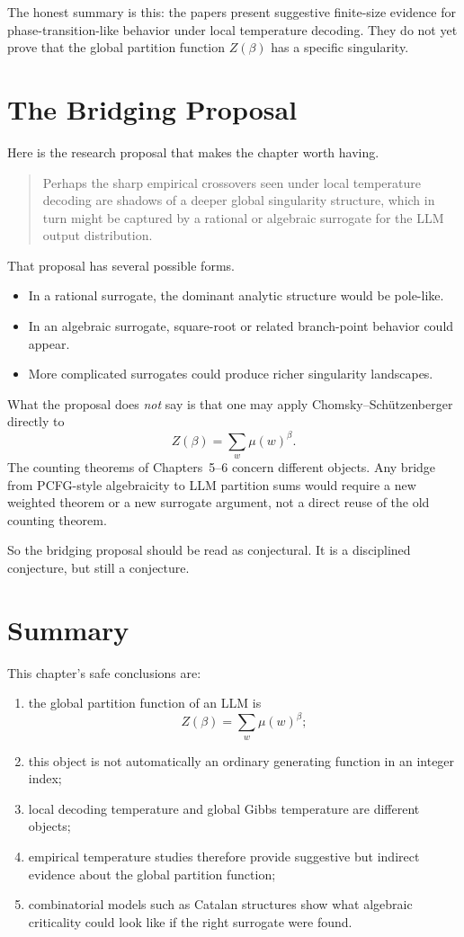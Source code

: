 The honest summary is this: the papers present suggestive finite-size evidence for phase-transition-like behavior under local temperature decoding. They do not yet prove that the global partition function $Z(\beta)$ has a specific singularity.

\section{The Bridging Proposal}

Here is the research proposal that makes the chapter worth having.

\begin{quote}
Perhaps the sharp empirical crossovers seen under local temperature decoding are shadows of a deeper global singularity structure, which in turn might be captured by a rational or algebraic surrogate for the LLM output distribution.
\end{quote}

That proposal has several possible forms.
\begin{itemize}
  \item In a rational surrogate, the dominant analytic structure would be pole-like.
  \item In an algebraic surrogate, square-root or related branch-point behavior could appear.
  \item More complicated surrogates could produce richer singularity landscapes.
\end{itemize}

What the proposal does \emph{not} say is that one may apply Chomsky--Sch\"utzenberger directly to
\[
  Z(\beta)=\sum_w \mu(w)^\beta.
\]
The counting theorems of Chapters~5--6 concern different objects. Any bridge from PCFG-style algebraicity to LLM partition sums would require a new weighted theorem or a new surrogate argument, not a direct reuse of the old counting theorem.

So the bridging proposal should be read as conjectural. It is a disciplined conjecture, but still a conjecture.

\section*{Summary}

This chapter's safe conclusions are:
\begin{enumerate}
  \item the global partition function of an LLM is
  \[
    Z(\beta)=\sum_w \mu(w)^\beta;
  \]
  \item this object is not automatically an ordinary generating function in an integer index;
  \item local decoding temperature and global Gibbs temperature are different objects;
  \item empirical temperature studies therefore provide suggestive but indirect evidence about the global partition function;
  \item combinatorial models such as Catalan structures show what algebraic criticality could look like if the right surrogate were found.
\end{enumerate}

